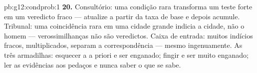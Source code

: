 \begin{solution}{pb:g12:condprob:1}
\textbf{20.} Consultório: uma condição rara transforma um
teste forte em um veredicto fraco --- atualize a partir da
taxa de base e depois acumule. Tribunal: uma coincidência
rara em uma cidade grande indicia a cidade, não o homem ---
verossimilhanças não são veredictos. Caixa de entrada: muitos
indícios fracos, multiplicados, separam a correspondência ---
mesmo ingenuamente. As três armadilhas: esquecer a
 a priori e ser enganado; fingir  e
ser muito enganado; ler as evidências aos pedaços e nunca
saber o que se sabe.
\end{solution}
